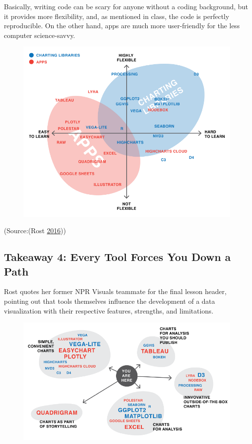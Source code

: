 \documentclass[]{book}
\begin{document}
Basically, writing code can be scary for anyone without a coding
background, but it provides more flexibility, and, as mentioned in
class, the code is perfectly reproducible. On the other hand, apps are
much more user-friendly for the less computer science-savvy.

\begin{figure}
\centering
\includegraphics{images/apps_vs_code.png}
\caption{}
\end{figure}

(Source:(Rost \protect\hyperlink{ref-different_tools}{2016}))

\subsection{Takeaway 4: Every Tool Forces You Down a
Path}\label{takeaway-4-every-tool-forces-you-down-a-path}

Rost quotes her former NPR Visuals teammate for the final lesson header,
pointing out that tools themselves influence the development of a data
visualization with their respective features, strengths, and
limitations.

\begin{figure}
\centering
\includegraphics{images/tools_force_paths.png}
\caption{}
\end{figure}
\end{document}
